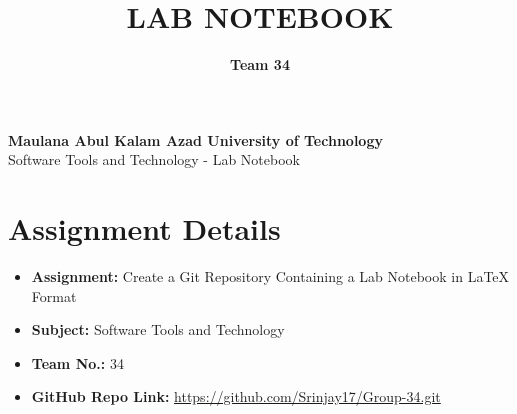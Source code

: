 \documentclass[a4paper,15pt]{article}
\title{\textbf{LAB NOTEBOOK}}
\author{\textbf{Team 34}}
\date{}
\begin{document}
\maketitle


\begin{center}
    \Large\textbf{Maulana Abul Kalam Azad University of Technology}\\
    \vspace{0.2cm}
    \large Software Tools and Technology - Lab Notebook
\end{center}

\vspace{1cm}

\section*{Assignment Details}
\begin{itemize}[leftmargin=1.5cm]
    \item \textbf{Assignment:} Create a Git Repository Containing a Lab Notebook in LaTeX Format
    \item \textbf{Subject:} Software Tools and Technology
    \item \textbf{Team No.:} 34
    \item \textbf{GitHub Repo Link:} \url{https://github.com/Srinjay17/Group-34.git}
\end{itemize}

\vspace{1cm}
\end{document}
